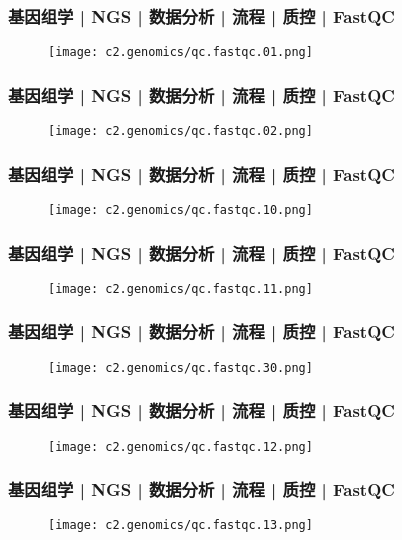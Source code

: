 \begin{frame}
  \frametitle{基因组学 | NGS | 数据分析 | 流程 | 质控 | FastQC}
  \begin{figure}
    \centering
    \texttt{[image: c2.genomics/qc.fastqc.01.png]}
  \end{figure}
\end{frame}

\begin{frame}
  \frametitle{基因组学 | NGS | 数据分析 | 流程 | 质控 | FastQC}
  \begin{figure}
    \centering
    \texttt{[image: c2.genomics/qc.fastqc.02.png]}
  \end{figure}
\end{frame}

\begin{frame}
  \frametitle{基因组学 | NGS | 数据分析 | 流程 | 质控 | FastQC}
  \begin{figure}
    \centering
    \texttt{[image: c2.genomics/qc.fastqc.10.png]}
  \end{figure}
\end{frame}

\begin{frame}
  \frametitle{基因组学 | NGS | 数据分析 | 流程 | 质控 | FastQC}
  \begin{figure}
    \centering
    \texttt{[image: c2.genomics/qc.fastqc.11.png]}
  \end{figure}
\end{frame}

\begin{frame}
  \frametitle{基因组学 | NGS | 数据分析 | 流程 | 质控 | FastQC}
  \begin{figure}
    \centering
    \texttt{[image: c2.genomics/qc.fastqc.30.png]}
  \end{figure}
\end{frame}

\begin{frame}
  \frametitle{基因组学 | NGS | 数据分析 | 流程 | 质控 | FastQC}
  \begin{figure}
    \centering
    \texttt{[image: c2.genomics/qc.fastqc.12.png]}
  \end{figure}
\end{frame}

\begin{frame}
  \frametitle{基因组学 | NGS | 数据分析 | 流程 | 质控 | FastQC}
  \begin{figure}
    \centering
    \texttt{[image: c2.genomics/qc.fastqc.13.png]}
  \end{figure}
\end{frame}

